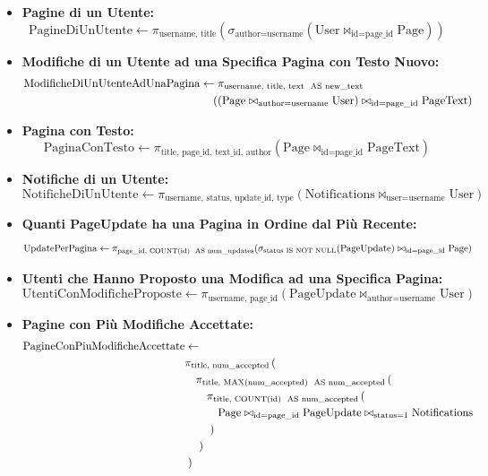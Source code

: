 \documentclass{article}
\begin{document}
	\begin{itemize}
			\item \textbf{Pagine di un Utente:}
			\[ \text{PagineDiUnUtente} \leftarrow \pi_{\text{username, title}}(\sigma_{\text{author=username}}(\text{User} \bowtie_{\text{id=page\_id}} \text{Page})) \]
			
			\item \textbf{Modifiche di un Utente ad una Specifica Pagina con Testo Nuovo:}
			\begin{align*}
				\text{ModificheDiUnUtenteAdUnaPagina} &\leftarrow \pi_{\text{username, title, text \text{ AS new\_text}}} \\
				&\quad\left(
				(\text{Page} \bowtie_{\text{author=username}} \text{User}) \bowtie_{\text{id=page\_id}} \text{PageText}
				\right)
			\end{align*}

			
			
			\item \textbf{Pagina con Testo:}
			\[
			\text{PaginaConTesto} \leftarrow \pi_{\text{title, page\_id, text\_id, author}}(\text{Page} \bowtie_{\text{id=page\_id}} \text{PageText})
			\]

			
			\item \textbf{Notifiche di un Utente:}
			\[ \text{NotificheDiUnUtente} \leftarrow \pi_{\text{username, status, update\_id, type}}(\text{Notifications} \bowtie_{\text{user=username}} \text{User}) \]
			
			\item \textbf{Quanti PageUpdate ha una Pagina in Ordine dal Più Recente:}
			\[ \text{UpdatePerPagina} \leftarrow \pi_{\text{page\_id, COUNT(id) \text{ AS num\_updates}}}(\sigma_{\text{status IS NOT NULL}}(\text{PageUpdate}) \bowtie_{\text{id=page\_id}} \text{Page}) \]
			
			\item \textbf{Utenti che Hanno Proposto una Modifica ad una Specifica Pagina:}
			\[ \text{UtentiConModificheProposte} \leftarrow \pi_{\text{username, page\_id}}(\text{PageUpdate} \bowtie_{\text{author=username}} \text{User}) \]
			
			\item \textbf{Pagine con Più Modifiche Accettate:}
\begin{align*}
	\text{PagineConPiuModificheAccettate} &\leftarrow \\
	&\pi_{\text{title, num\_accepted}} \left( \right. \\
	&\quad \pi_{\text{title, MAX(num\_accepted) \text{ AS num\_accepted}}} \left( \right. \\
	&\quad \quad \pi_{\text{title, COUNT(id) \text{ AS num\_accepted}}} \left( \right. \\
	&\quad \quad \quad \text{Page} \bowtie_{\text{id=page\_id}} \text{PageUpdate} \bowtie_{\text{status=1}} \text{Notifications} \\
	&\quad \quad \left. \right) \\
	&\quad \left. \right) \\
	&\left. \right)
\end{align*}





\end{itemize}
\end{document}
